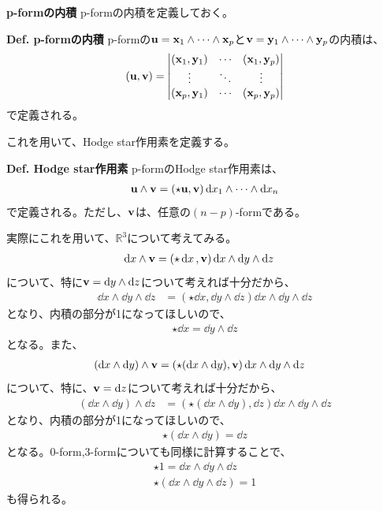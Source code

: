 \documentclass[a4paper,11pt]{jsarticle}
\numberwithin{equation}{section}
\begin{document}
\textbf{p-formの内積}
p-formの内積を定義しておく。
\begin{itembox}[l]{\textbf{Def. p-formの内積}}
  p-formの$\vb{u} = \vb{x}_1 \wedge \cdots \wedge \vb{x}_p$と$\vb{v} = \vb{y}_1 \wedge \cdots \wedge \vb{y}_p$の内積は、
  \begin{align}
    (\vb{u},\vb{v}) = 
    \begin{vmatrix}
      (\vb{x}_1,\vb{y}_1) & \cdots & (\vb{x}_1,\vb{y}_p)\\
      \vdots & \ddots & \vdots\\
      (\vb{x}_p,\vb{y}_1) & \cdots & (\vb{x}_p,\vb{y}_p)
    \end{vmatrix}
  \end{align}
  で定義される。
\end{itembox}

これを用いて、Hodge star作用素を定義する。
\begin{itembox}[l]{\textbf{Def. Hodge star作用素}}
  p-formのHodge star作用素は、
  \begin{align}
    \vb{u} \wedge \vb{v} = (\star \vb{u},\vb{v})\dd{x}_1\wedge \cdots \wedge \dd{x}_n
  \end{align}
  で定義される。ただし、$\vb{v}$は、任意の$(n-p)$-formである。
\end{itembox}
実際にこれを用いて、$\mathbb{R}^3$について考えてみる。
\begin{align}
  \dd{x} \wedge \vb{v} &= (\star \dd{x},\vb{v})\dd{x}\wedge \dd{y}\wedge \dd{z}
\end{align}
について、特に$\vb{v} = \dd{y} \wedge \dd{z}$について考えれば十分だから、
\begin{align}
  \dd{x} \wedge \dd{y} \wedge \dd{z} &= (\star \dd{x},\dd{y} \wedge \dd{z})\dd{x}\wedge \dd{y}\wedge \dd{z}
\end{align}
となり、内積の部分が1になってほしいので、
\begin{align}
  \star \dd{x} = \dd{y} \wedge \dd{z}
\end{align}
となる。また、
\begin{align}
  (\dd{x} \wedge \dd{y} ) \wedge \vb{v} &= (\star (\dd{x} \wedge \dd{y}),\vb{v})\dd{x}\wedge \dd{y}\wedge \dd{z}
\end{align}
について、特に、$\vb{v} = \dd{z}$について考えれば十分だから、
\begin{align}
  (\dd{x} \wedge \dd{y} ) \wedge \dd{z} &= (\star (\dd{x} \wedge \dd{y}),\dd{z})\dd{x}\wedge \dd{y}\wedge \dd{z}
\end{align}
となり、内積の部分が1になってほしいので、
\begin{align}
  \star (\dd{x} \wedge \dd{y}) = \dd{z}
\end{align}
となる。0-form,3-formについても同様に計算することで、
\begin{align}
  \star 1 = \dd{x}\wedge \dd{y}\wedge \dd{z}\\
  \star( \dd{x} \wedge \dd{y} \wedge \dd{z}) = 1
\end{align}
も得られる。
\end{document}
